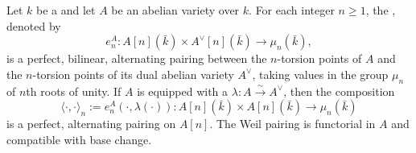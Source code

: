 \begin{definition} \label{definition:weil_pairing_on_an_abelian_variety_over_a_field}
    Let $k$ be a  and let $A$ be an abelian variety over $k$. For each integer $n \geq 1$, the , denoted by
        $$e_n^A : A[n](\bar{k}) \times A^\vee[n](\bar{k}) \to \mu_n(\bar{k}),$$
    is a perfect, bilinear, alternating pairing between the $n$-torsion points of $A$ and the $n$-torsion points of its dual abelian variety $A^\vee$, taking values in the group $\mu_n$ of $n$th roots of unity. If $A$ is equipped with a  $\lambda : A \xrightarrow{\sim} A^\vee$, then the composition
        $$\langle \cdot, \cdot \rangle_n := e_n^A(\cdot, \lambda(\cdot)) : A[n](\bar{k}) \times A[n](\bar{k}) \to \mu_n(\bar{k})$$
    is a perfect, alternating pairing on $A[n]$. The Weil pairing is functorial in $A$ and compatible with base change.
\end{definition}
